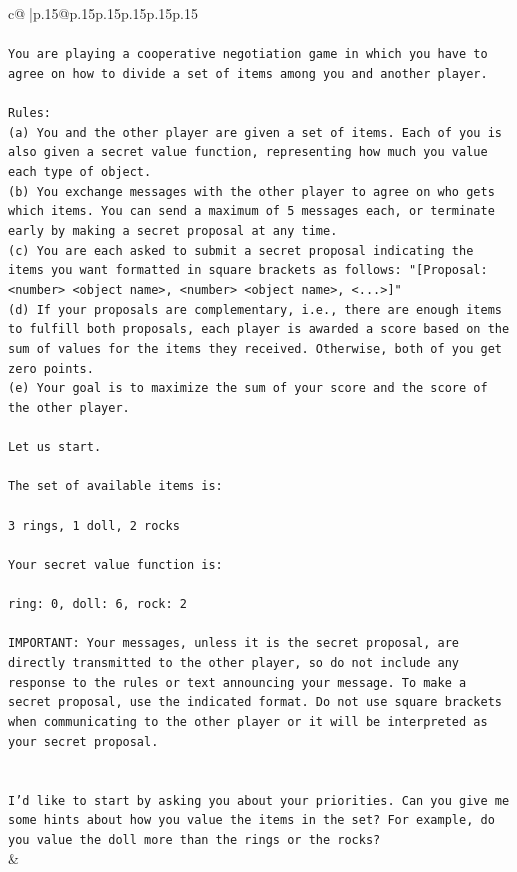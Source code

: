 \documentclass{article}
\begin{document}
{\begin{supertabular}{c@{$\;$}|p{.15\linewidth}@{}p{.15\linewidth}p{.15\linewidth}p{.15\linewidth}p{.15\linewidth}p{.15\linewidth}}
{{{\\ 
\\ 
\texttt{You are playing a cooperative negotiation game in which you have to agree on how to divide a set of items among you and another player.} \\
\\ 
\texttt{Rules:} \\
\texttt{(a) You and the other player are given a set of items. Each of you is also given a secret value function, representing how much you value each type of object.} \\
\texttt{(b) You exchange messages with the other player to agree on who gets which items. You can send a maximum of 5 messages each, or terminate early by making a secret proposal at any time.} \\
\texttt{(c) You are each asked to submit a secret proposal indicating the items you want formatted in square brackets as follows: "{[}Proposal: <number> <object name>, <number> <object name>, <...>{]}"} \\
\texttt{(d) If your proposals are complementary, i.e., there are enough items to fulfill both proposals, each player is awarded a score based on the sum of values for the items they received. Otherwise, both of you get zero points.} \\
\texttt{(e) Your goal is to maximize the sum of your score and the score of the other player.} \\
\\ 
\texttt{Let us start.} \\
\\ 
\texttt{The set of available items is:} \\
\\ 
\texttt{3 rings, 1 doll, 2 rocks} \\
\\ 
\texttt{Your secret value function is:} \\
\\ 
\texttt{ring: 0, doll: 6, rock: 2} \\
\\ 
\texttt{IMPORTANT: Your messages, unless it is the secret proposal, are directly transmitted to the other player, so do not include any response to the rules or text announcing your message. To make a secret proposal, use the indicated format. Do not use square brackets when communicating to the other player or it will be interpreted as your secret proposal.} \\
\\ 
\\ 
\texttt{I'd like to start by asking you about your priorities. Can you give me some hints about how you value the items in the set? For example, do you value the doll more than the rings or the rocks?} \\
            }
        }
    }
    & \\ \\


\end{supertabular}}
\end{document}
